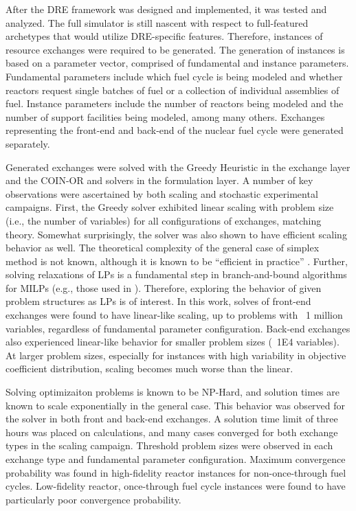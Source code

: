 After the DRE framework was designed and implemented, it was tested and
analyzed. The full \Cyclus simulator is still nascent with respect to
full-featured archetypes that would utilize DRE-specific features. Therefore,
instances of resource exchanges were required to be generated. The generation of
instances is based on a parameter vector, comprised of fundamental and instance
parameters. Fundamental parameters include which fuel cycle is being modeled and
whether reactors request single batches of fuel or a collection of individual
assemblies of fuel. Instance parameters include the number of reactors being
modeled and the number of support facilities being modeled, among many
others. Exchanges representing the front-end and back-end of the nuclear fuel
cycle were generated separately.

Generated exchanges were solved with the Greedy Heuristic in the exchange layer
and the COIN-OR \clp and \cbc solvers in the formulation layer. A number of key
observations were ascertained by both scaling and stochastic experimental
campaigns. First, the Greedy solver exhibited linear scaling with problem size
(i.e., the number of variables) for all configurations of exchanges, matching
theory. Somewhat surprisingly, the \clp solver was also shown to have efficient
scaling behavior as well. The theoretical complexity of the general case of
simplex method is not known, although it is known to be ``efficient in
practice'' \cite{goldfarb1994complexity}. Further, solving relaxations of LPs is
a fundamental step in branch-and-bound algorithms for MILPs (e.g., those used in
\cbc). Therefore, exploring the behavior of given problem structures as LPs is of
interest. In this work, \clp solves of front-end exchanges were found to have
linear-like scaling, up to problems with ~1 million variables, regardless of
fundamental parameter configuration. Back-end exchanges also experienced
linear-like behavior for smaller problem sizes (~1E4 variables). At larger
problem sizes, especially for instances with high variability in objective
coefficient distribution, scaling becomes much worse than the linear.

Solving optimizaiton problems is known to be NP-Hard, and solution times are
known to scale exponentially in the general case. This behavior was observed for
the \cbc solver in both front and back-end exchanges. A solution time limit of
three hours was placed on \cbc calculations, and many cases converged for both
exchange types in the scaling campaign. Threshold problem sizes were observed in
each exchange type and fundamental parameter configuration. Maximum convergence
probability was found in high-fidelity reactor instances for non-once-through
fuel cycles. Low-fidelity reactor, once-through fuel cycle instances were found
to have particularly poor convergence probability.

